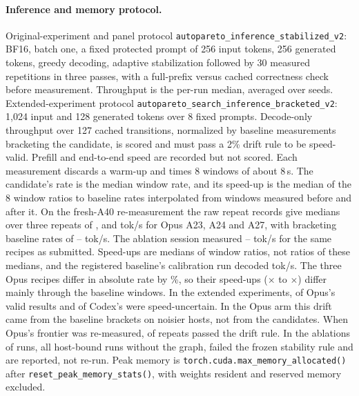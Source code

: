 \documentclass{article}
\begin{document}
\begin{table}[H]
\caption{Recorded software environment by era. Panel, Pair-A (extended experiments), E1 and Opus-test rows are read from their run records. Other rows are from the provenance audit.}\label{tab:env}
\centering\scriptsize
\end{table}

\paragraph{Inference and memory protocol.} Original-experiment and panel protocol \texttt{autopareto\_inference\_stabilized\_v2}: BF16, batch one, a fixed protected prompt of 256 input tokens, 256 generated tokens, greedy decoding, adaptive stabilization followed by 30 measured repetitions in three passes, with a full-prefix versus cached correctness check before measurement. Throughput is the per-run median, averaged over seeds. Extended-experiment protocol \texttt{autopareto\_search\_inference\_bracketed\_v2}: 1,024 input and 128 generated tokens over 8 fixed prompts. Decode-only throughput over 127 cached transitions, normalized by baseline measurements bracketing the candidate, is scored and must pass a 2\% drift rule to be speed-valid. Prefill and end-to-end speed are recorded but not scored. Each measurement discards a warm-up and times 8 windows of about 8\,s. The candidate's rate is the median window rate, and its speed-up is the median of the 8 window ratios to baseline rates interpolated from windows measured before and after it. On the fresh-A40 re-measurement the raw repeat records give medians over three repeats of \CROpAbsTwentyThree, \CROpAbsTwentyFour{} and \CROpAbsTwentySeven{} tok/s for Opus A23, A24 and A27, with bracketing baseline rates of \CRPTwoBaseLo--\CRPTwoBaseHi{} tok/s. The ablation session measured \CRIAAbsLo--\CRIAAbsHi{} tok/s for the same recipes as submitted. Speed-ups are medians of window ratios, not ratios of these medians, and the registered baseline's calibration run decoded \CRAgBaseDecode{} tok/s. The three Opus recipes differ in absolute rate by \CROpAbsSpreadPct\%, so their speed-ups (\CROpDecodeLo$\times$ to \CROpDecodeHi$\times$) differ mainly through the baseline windows. In the extended experiments, \CROpUncertain{} of Opus's \CROpValid{} valid results and \CRCxUncertain{} of Codex's \CRCxValid{} were speed-uncertain. In the Opus arm this drift came from the baseline brackets on noisier hosts, not from the candidates. When Opus's frontier was re-measured, \CROpStableRepeats{} of \CROpRepeats{} repeats passed the drift rule. In the ablations \CRIAUnstable{} of \CRIARuns{} runs, all host-bound runs without the graph, failed the frozen stability rule and are reported, not re-run. Peak memory is \texttt{torch.cuda.max\_memory\_allocated()} after \texttt{reset\_peak\_memory\_stats()}, with weights resident and reserved memory excluded.
\end{document}
